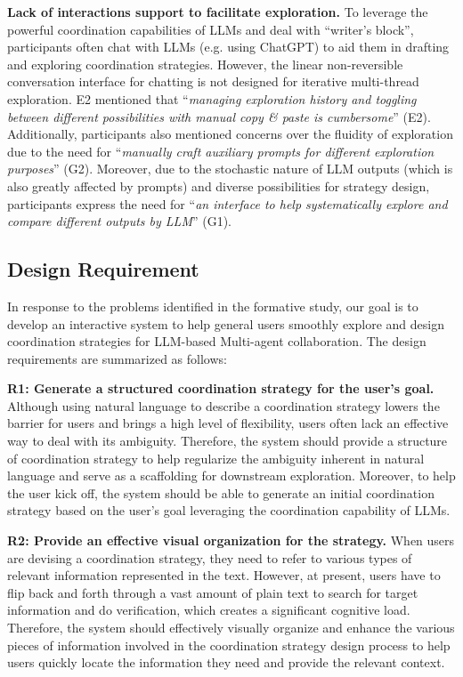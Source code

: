 \textbf{Lack of interactions support to facilitate exploration.} To leverage the powerful coordination capabilities of LLMs and deal with ``writer’s block'', participants often chat with LLMs (e.g. using ChatGPT) to aid them in drafting and exploring coordination strategies. However, the linear non-reversible conversation interface for chatting is not designed for iterative multi-thread exploration. E2 mentioned that  ``\textit{managing exploration history and toggling between different possibilities with manual copy \& paste is cumbersome}'' (E2). Additionally, participants also mentioned concerns over the fluidity of exploration due to the need for ``\textit{manually craft auxiliary prompts for different exploration purposes}'' (G2). Moreover, due to the stochastic nature of LLM outputs (which is also greatly affected by prompts) and diverse possibilities for strategy design, participants express the need for ``\textit{an interface to help systematically explore and compare different outputs by LLM}'' (G1). 

\subsection{Design Requirement}
In response to the problems identified in the formative study, our goal is to develop an interactive system to help general users smoothly explore and design coordination strategies for LLM-based Multi-agent collaboration. The design requirements are summarized as follows:

\textbf{R1: Generate a structured coordination strategy for the user's goal.} Although using natural language to describe a coordination strategy lowers the barrier for users and brings a high level of flexibility, users often lack an effective way to deal with its ambiguity. Therefore, the system should provide a structure of coordination strategy to help regularize the ambiguity inherent in natural language and serve as a scaffolding for downstream exploration. Moreover, to help the user kick off, the system should be able to generate an initial coordination strategy based on the user's goal leveraging the coordination capability of LLMs.

\textbf{R2: Provide an effective visual organization for the strategy.} When users are devising a coordination strategy, they need to refer to various types of relevant information represented in the text. However, at present, users have to flip back and forth through a vast amount of plain text to search for target information and do verification, which creates a significant cognitive load. Therefore, the system should effectively visually organize and enhance the various pieces of information involved in the coordination strategy design process to help users quickly locate the information they need and provide the relevant context.

